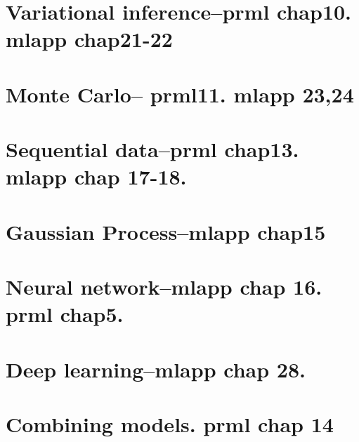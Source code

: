 \documentclass{article}
\begin{document}
\section{Variational inference--prml chap10. mlapp chap21-22}

\section{Monte Carlo-- prml11. mlapp 23,24}

\section{Sequential data--prml chap13. mlapp chap 17-18.}

\section{Gaussian Process--mlapp chap15}

\section{Neural network--mlapp chap 16. prml chap5.}

\section{Deep learning--mlapp chap 28.}

\section{Combining models. prml chap 14}
\end{document}
